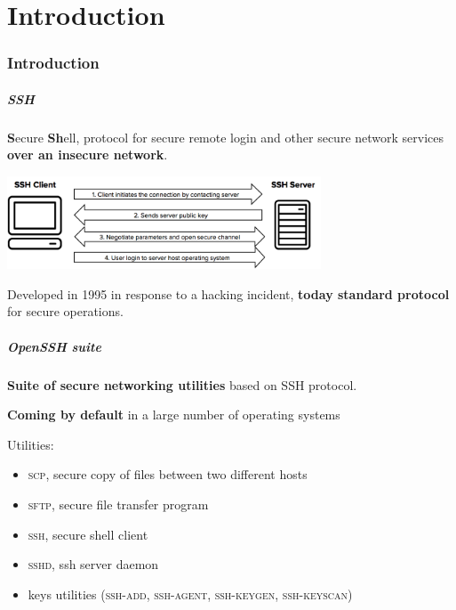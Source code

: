 \part{Introduction}
\section{Introduction}

\begin{frame}
	\partpage
\end{frame}

\begin{frame}
	\frametitle{SSH}
	
	\textbf{S}ecure \textbf{Sh}ell, protocol for secure remote login and other secure network services \textbf{over an insecure network}. 
	
	\smallskip
	
	\begin{center}    
  \includegraphics[width=0.7\textwidth]{images/ssh}
  \end{center}

	\smallskip
	
	Developed in 1995 in response to a hacking incident, \textbf{today standard protocol} for secure operations.


\end{frame}


\begin{frame}
	\frametitle{OpenSSH suite}
		
	\textbf{Suite of secure networking utilities} based on SSH protocol.
	
	\medskip
	
	\textbf{Coming by default} in a large number of operating systems
	
	\medskip
		
	Utilities:
	
	\begin{itemize}
	  \item \textsc{scp}, secure copy of files between two different hosts
	  \item \textsc{sftp}, secure file transfer program
	  \item \textsc{ssh}, secure shell client
	  \item \textsc{sshd}, ssh server daemon
	  \item keys utilities (\textsc{ssh-add}, \textsc{ssh-agent}, \textsc{ssh-keygen}, \textsc{ssh-keyscan})
	\end{itemize}

\end{frame}


